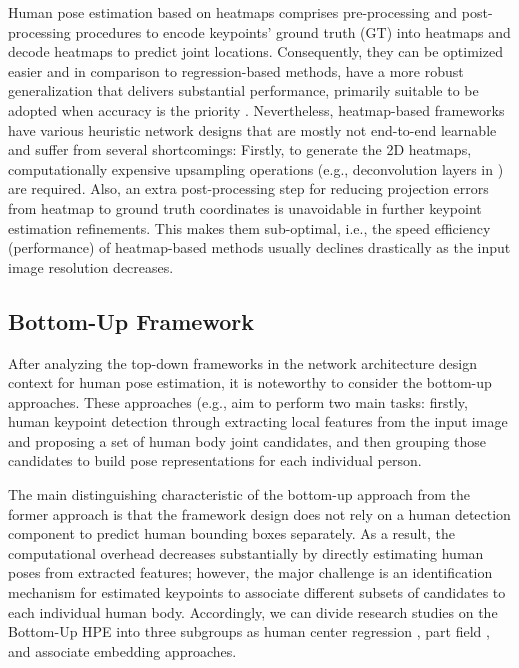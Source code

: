 Human pose estimation based on heatmaps comprises pre-processing and post-processing procedures to encode keypoints' ground truth (GT) into heatmaps and decode heatmaps to predict joint locations. Consequently, they can be optimized easier and in comparison to regression-based methods, have a more robust generalization that delivers substantial performance, primarily suitable to be adopted when accuracy is the priority \cite{pfister_flowing_2015}. Nevertheless, heatmap-based frameworks have various heuristic network designs that are mostly not end-to-end learnable and suffer from several shortcomings: Firstly, to generate the 2D heatmaps, computationally expensive upsampling operations (e.g., deconvolution layers in \cite{yixing_gao_user_2015}) are required. Also, an extra post-processing step for reducing projection errors from heatmap to ground truth coordinates is unavoidable in further keypoint estimation refinements. This makes them sub-optimal, i.e., the speed efficiency (performance) of heatmap-based methods usually declines drastically as the input image resolution decreases. 

\subsection{Bottom-Up Framework}
 
After analyzing the top-down frameworks in the network architecture design context for human pose estimation, it is noteworthy to consider the bottom-up approaches. These approaches (e.g.,\cite{micilotta_real-time_2006, cheng_higherhrnet_2020, fieraru_learning_2018, jin_differentiable_2020, kreiss_pifpaf_2019, nie_single-stage_2019,insafutdinov_arttrack_2017, insafutdinov_deepercut_2016, newell_associative_2017, pishchulin_deepcut_2016, tian_directpose_2019} aim to perform two main tasks: firstly, human keypoint detection through extracting local features from the input image and proposing a set of human body joint candidates, and then grouping those candidates to build pose representations for each individual person. 

The main distinguishing characteristic of the bottom-up approach from the former approach is that the framework design does not rely on a human detection component to predict human bounding boxes separately. As a result, the computational overhead decreases substantially by directly estimating human poses from extracted features; however, the major challenge is an identification mechanism for estimated keypoints to associate different subsets of candidates to each individual human body. Accordingly, we can divide research studies on the Bottom-Up HPE into three subgroups as human center regression \cite{geng_bottom-up_2021, nie_single-stage_2019, nie_human_2018}, part field \cite{jin_differentiable_2020, kreiss_pifpaf_2019, martinez_single-network_2019, insafutdinov_deepercut_2016, li_simple_2019}, and associate embedding \cite{cheng_higherhrnet_2020, jin_multi-person_2019, luo_rethinking_2021, newell_associative_2017} approaches. 

